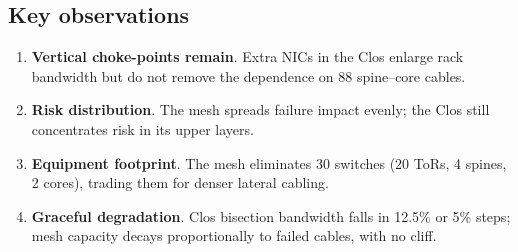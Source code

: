 \documentclass[../../../OAE-SPEC-MAIN.tex]{subfiles}
\begin{document}
\subsection{Key observations}
\begin{enumerate}
  \item \textbf{Vertical choke-points remain}.  
        Extra NICs in the Clos enlarge rack bandwidth but do not remove
        the dependence on 88 spine--core cables.
  \item \textbf{Risk distribution}.  
        The mesh spreads failure impact evenly; the Clos still
        concentrates risk in its upper layers.
  \item \textbf{Equipment footprint}.  
        The mesh eliminates 30 switches (20 ToRs, 4 spines, 2 cores),
        trading them for denser lateral cabling.
  \item \textbf{Graceful degradation}.  
        Clos bisection bandwidth falls in 12.5\% or 5\% steps; mesh
        capacity decays proportionally to failed cables, with no cliff.
\end{enumerate}
\end{document}
